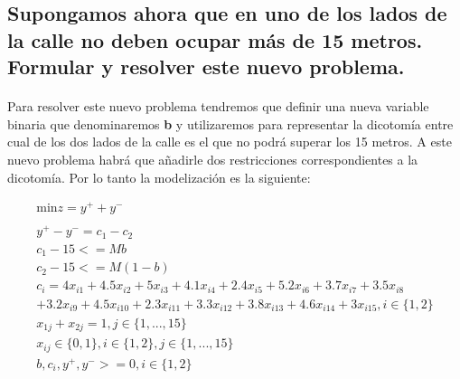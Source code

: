 \documentclass[10pt, a4paper]{article}
\begin{document}
		\subsection{Supongamos ahora que en uno de los lados de la calle no deben ocupar más de 15 metros. Formular y resolver este nuevo problema.}

			\paragraph{}
			Para resolver este nuevo problema tendremos que definir una nueva variable binaria que denominaremos \textbf{b} y utilizaremos para representar la dicotomía entre cual de los dos lados de la calle es el que no podrá superar los 15 metros. A este nuevo problema habrá que añadirle dos restricciones correspondientes a la dicotomía. Por lo tanto la modelización es la siguiente:

			\[
				\begin{split}
					\text{min} z = y^{+} + y^{-} \\ \\
						y^{+} - y^{-} = c_1 - c_2 \\
						c_1 - 15 <= Mb \\
						c_2 - 15 <= M(1-b) \\
						c_i = 4x_{i1} + 4.5x_{i2} + 5x_{i3} + 4.1x_{i4} + 2.4x_{i5} + 5.2x_{i6} + 3.7x_{i7} + 3.5x_{i8} \\
						+ 3.2x_{i9} + 4.5x_{i10} + 2.3x_{i11} + 3.3x_{i12} + 3.8x_{i13} + 4.6x_{i14} + 3x_{i15}, i \in \{1,2\}\\
						x_{1j} + x_{2j} = 1, j \in \{1,...,15\} \\
						x_{ij} \in \{0,1\}, i \in \{1,2\},j \in \{1,...,15\} \\
						b, c_{i}, y^{+}, y^{-} >= 0, i \in \{1,2\}\\
				\end{split}
			\]
\end{document}
